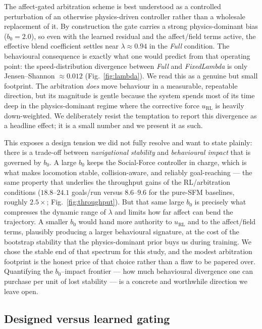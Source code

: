 \documentclass[sigconf,nonacm]{acmart}
\begin{document}
The affect-gated arbitration scheme is best understood as a controlled perturbation of an otherwise physics-driven controller rather than a wholesale replacement of it. By construction the gate carries a strong physics-dominant bias ($b_0 = 2.0$), so even with the learned residual and the affect/field terms active, the effective blend coefficient settles near $\lambda \approx 0.94$ in the \emph{Full} condition. The behavioural consequence is exactly what one would predict from that operating point: the speed-distribution divergence between \emph{Full} and \emph{FixedLambda} is only Jensen--Shannon $\approx 0.012$ (Fig.~\ref{fig:lambda}). We read this as a genuine but small footprint. The arbitration \emph{does} move behaviour in a measurable, repeatable direction, but its magnitude is gentle because the system spends most of its time deep in the physics-dominant regime where the corrective force $u_{\mathrm{RL}}$ is heavily down-weighted. We deliberately resist the temptation to report this divergence as a headline effect; it is a small number and we present it as such.

This exposes a design tension we did not fully resolve and want to state plainly: there is a trade-off between \emph{navigational stability} and \emph{behavioural impact} that is governed by $b_0$. A large $b_0$ keeps the Social-Force controller in charge, which is what makes locomotion stable, collision-aware, and reliably goal-reaching --- the same property that underlies the throughput gains of the RL/arbitration conditions ($18.8$--$24.1$ goals/run versus $8.6$--$9.6$ for the pure-SFM baselines, roughly $2.5\times$; Fig.~\ref{fig:throughput}). But that same large $b_0$ is precisely what compresses the dynamic range of $\lambda$ and limits how far affect can bend the trajectory. A smaller $b_0$ would hand more authority to $u_{\mathrm{RL}}$ and to the affect/field terms, plausibly producing a larger behavioural signature, at the cost of the bootstrap stability that the physics-dominant prior buys us during training. We chose the stable end of that spectrum for this study, and the modest arbitration footprint is the honest price of that choice rather than a flaw to be papered over. Quantifying the $b_0$--impact frontier --- how much behavioural divergence one can purchase per unit of lost stability --- is a concrete and worthwhile direction we leave open.

\subsection{Designed versus learned gating}
\end{document}
